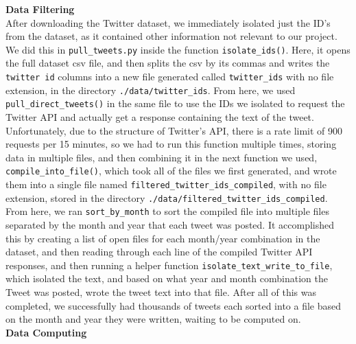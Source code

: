 \documentclass[fontsize=11pt]{article}
\begin{document}
    \textbf{Data Filtering}\\
    After downloading the Twitter dataset, we immediately isolated just the ID's from the dataset, as it contained other information not relevant to our project. We did this in \texttt{pull\_tweets.py} inside the function \texttt{isolate\_ids()}. Here, it opens the full dataset csv file, and then splits the csv by its commas and writes the \texttt{twitter id} columns into a new file generated called \texttt{twitter\_ids} with no file extension, in the directory \texttt{./data/twitter\_ids}. From here, we used \texttt{pull\_direct\_tweets()} in the same file to use the IDs we isolated to request the Twitter API and actually get a response containing the text of the tweet. Unfortunately, due to the structure of Twitter's API, there is a rate limit of 900 requests per 15 minutes, so we had to run this function multiple times, storing data in multiple files, and then combining it in the next function we used, \texttt{compile\_into\_file()}, which took all of the files we first generated, and wrote them into a single file named \texttt{filtered\_twitter\_ids\_compiled}, with no file extension, stored in the directory \texttt{./data/filtered\_twitter\_ids\_compiled}. From here, we ran \texttt{sort\_by\_month} to sort the compiled file into multiple files separated by the month and year that each tweet was posted. It accomplished this by creating a list of open files for each month/year combination in the dataset, and then reading through each line of the compiled Twitter API responses, and then running a helper function \texttt{isolate\_text\_write\_to\_file}, which isolated the text, and based on what year and month combination the Tweet was posted, wrote the tweet text into that file. After all of this was completed, we successfully had thousands of tweets each sorted into a file based on the month and year they were written, waiting to be computed on. \\
    \hfill\break
    \textbf{Data Computing} \\
\end{document}
